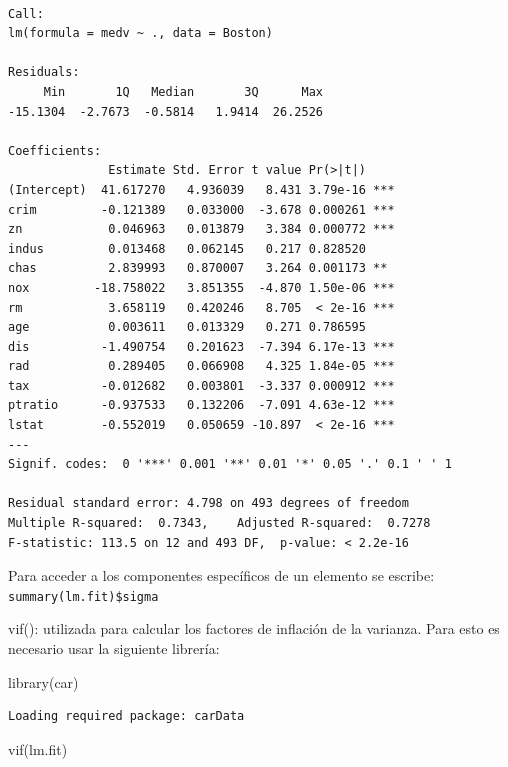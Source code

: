 \documentclass[
  letterpaper,
  DIV=11,
  numbers=noendperiod]{scrartcl}
\newenvironment{Shaded}{\begin{snugshade}}{\end{snugshade}}
\newcommand{\FunctionTok}[1]{\textcolor[rgb]{0.28,0.35,0.67}{#1}}
\newcommand{\NormalTok}[1]{\textcolor[rgb]{0.00,0.23,0.31}{#1}}
\begin{document}
\begin{verbatim}

Call:
lm(formula = medv ~ ., data = Boston)

Residuals:
     Min       1Q   Median       3Q      Max 
-15.1304  -2.7673  -0.5814   1.9414  26.2526 

Coefficients:
              Estimate Std. Error t value Pr(>|t|)    
(Intercept)  41.617270   4.936039   8.431 3.79e-16 ***
crim         -0.121389   0.033000  -3.678 0.000261 ***
zn            0.046963   0.013879   3.384 0.000772 ***
indus         0.013468   0.062145   0.217 0.828520    
chas          2.839993   0.870007   3.264 0.001173 ** 
nox         -18.758022   3.851355  -4.870 1.50e-06 ***
rm            3.658119   0.420246   8.705  < 2e-16 ***
age           0.003611   0.013329   0.271 0.786595    
dis          -1.490754   0.201623  -7.394 6.17e-13 ***
rad           0.289405   0.066908   4.325 1.84e-05 ***
tax          -0.012682   0.003801  -3.337 0.000912 ***
ptratio      -0.937533   0.132206  -7.091 4.63e-12 ***
lstat        -0.552019   0.050659 -10.897  < 2e-16 ***
---
Signif. codes:  0 '***' 0.001 '**' 0.01 '*' 0.05 '.' 0.1 ' ' 1

Residual standard error: 4.798 on 493 degrees of freedom
Multiple R-squared:  0.7343,    Adjusted R-squared:  0.7278 
F-statistic: 113.5 on 12 and 493 DF,  p-value: < 2.2e-16
\end{verbatim}

Para acceder a los componentes específicos de un elemento se escribe:
\texttt{summary(lm.fit)\$sigma}

vif(): utilizada para calcular los factores de inflación de la varianza.
Para esto es necesario usar la siguiente librería:

\begin{Shaded}
\begin{Highlighting}[]
\FunctionTok{library}\NormalTok{(car)}
\end{Highlighting}
\end{Shaded}

\begin{verbatim}
Loading required package: carData
\end{verbatim}

\begin{Shaded}
\begin{Highlighting}[]
\FunctionTok{vif}\NormalTok{(lm.fit)}
\end{Highlighting}
\end{Shaded}
\end{document}
